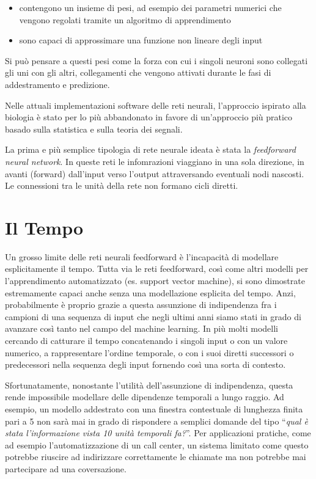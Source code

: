 \begin{itemize}
  \item contengono un insieme di pesi, ad esempio dei parametri numerici che vengono regolati tramite un algoritmo di apprendimento
  \item sono capaci di approssimare una funzione non lineare degli input
\end{itemize}

Si pu\`o pensare a questi pesi come la forza con cui i singoli neuroni sono collegati gli uni con gli altri, collegamenti che vengono attivati durante le fasi di addestramento e predizione.

Nelle attuali implementazioni software delle reti neurali, l'approccio ispirato alla biologia \`e stato per lo pi\`u abbandonato in favore di un'approccio pi\`u pratico basado sulla statistica e sulla teoria dei segnali.

La prima e pi\`u semplice tipologia di rete neurale ideata \`e stata la \emph{feedforward neural network}.
In queste reti le infomrazioni viaggiano in una sola direzione, in avanti (forward) dall'input verso l'output attraversando eventuali nodi nascosti.
Le connessioni tra le unit\`a della rete non formano cicli diretti.


\section{Il Tempo} %
Un grosso limite delle reti neurali feedforward \`e l'incapacit\`a di modellare esplicitamente il tempo.
Tutta via le reti feedforward, cos\`i come altri modelli per l'apprendimento automatizzato (es. support vector machine), si sono dimostrate estremamente capaci anche senza una modellazione esplicita del tempo.
Anzi, probabilmente \`e proprio grazie a questa assunzione di indipendenza fra i campioni di una sequenza di input che negli ultimi anni siamo stati in grado di avanzare cos\`i tanto nel campo del machine learning.
In pi\`u molti modelli cercando di catturare il tempo concatenando i singoli input o con un valore numerico, a rappresentare l'ordine temporale, o con i suoi diretti successori o predecessori nella sequenza degli input fornendo cos\`i una sorta di contesto.

Sfortunatamente, nonostante l'utilit\`a dell'assunzione di indipendenza, questa rende impossibile modellare delle dipendenze temporali a lungo raggio.
Ad esempio, un modello addestrato con una finestra contestuale di lunghezza finita pari a 5 non sar\`a mai in grado di rispondere a semplici domande del tipo ``\emph{qual \`e stata l'informazione vista 10 unit\`a temporali fa?}''.
Per applicazioni pratiche, come ad esempio l'automatizzazione di un call center, un sistema limitato come questo potrebbe riuscire ad indirizzare correttamente le chiamate ma non potrebbe mai partecipare ad una coversazione.

